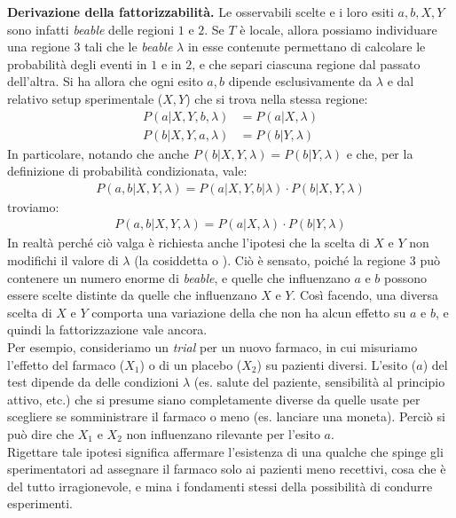 \documentclass[../../InformazioneQuantistica.tex]{subfiles}
\begin{document}
\begin{enumerate}
\begin{expl}
\textbf{Derivazione della fattorizzabilità.}
Le osservabili scelte e i loro esiti $a,b,X,Y$ sono infatti \textit{beable} delle regioni $1$ e $2$. Se $T$ è locale, allora possiamo individuare una regione $3$ tali che le \textit{beable} $\lambda$ in esse contenute permettano di calcolare le probabilità degli eventi in $1$ e in $2$, e che separi ciascuna regione dal passato dell'altra. Si ha allora che ogni esito $a,b$ dipende esclusivamente da $\lambda$ e dal relativo setup sperimentale ($X,Y$) che si trova nella stessa regione:
\begin{align*}
P(a|X,Y,b,\lambda) &= P(a|X,\lambda)\\
P(b|X,Y,a,\lambda) &= P(b|Y,\lambda)
\end{align*}
In particolare, notando che anche $P(b|X,Y,\lambda)=P(b|Y,\lambda)$ e che, per la definizione di probabilità condizionata, vale:
\begin{align*}
P(a,b|X,Y,\lambda) = P(a|X,Y,b|\lambda) \cdot P(b|X,Y,\lambda)
\end{align*}
troviamo:
\begin{align*}
P(a,b|X,Y,\lambda)=P(a|X,\lambda) \cdot P(b|Y,\lambda)
\end{align*}
In realtà perché ciò valga è richiesta anche l'ipotesi che la scelta di $X$ e $Y$ non modifichi il valore di $\lambda$ (la cosiddetta  o ). Ciò è sensato, poiché la regione $3$ può contenere un numero enorme di \textit{beable}, e quelle che influenzano $a$ e $b$ possono essere scelte distinte da quelle che influenzano $X$ e $Y$. Così facendo, una diversa scelta di $X$ e $Y$ comporta una variazione della  che non ha alcun effetto su $a$ e $b$, e quindi la fattorizzazione vale ancora.\\
Per esempio, consideriamo un \textit{trial} per un nuovo farmaco, in cui misuriamo l'effetto del farmaco ($X_1$) o di un placebo ($X_2$) su pazienti diversi. L'esito ($a$) del test dipende da delle condizioni $\lambda$ (es. salute del paziente, sensibilità al principio attivo, etc.) che si presume siano completamente diverse da quelle usate per scegliere se somministrare il farmaco o meno (es. lanciare una moneta). Perciò si può dire che $X_1$ e $X_2$ non influenzano  rilevante per l'esito $a$.\\
Rigettare tale ipotesi significa affermare l'esistenza di una qualche  che spinge gli sperimentatori ad assegnare il farmaco solo ai pazienti meno recettivi, cosa che è del tutto irragionevole, e mina i fondamenti stessi della possibilità di condurre esperimenti.\\


\end{expl}
\end{enumerate}
\end{document}
